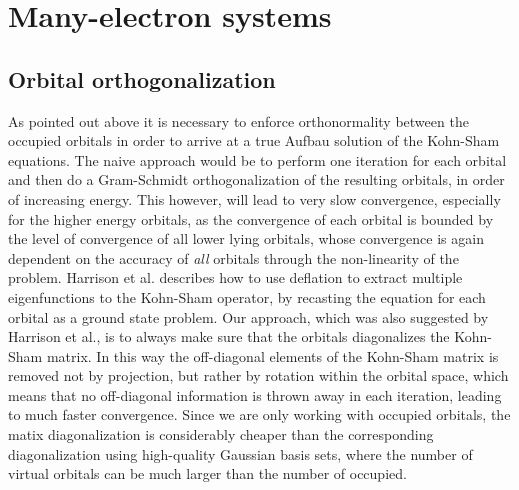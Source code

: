 \section{Many-electron systems}
\subsection{Orbital orthogonalization}
As pointed out above it is necessary to enforce orthonormality between the 
occupied orbitals in order to arrive at a true Aufbau solution of the Kohn-Sham 
equations. The naive approach would be to perform one iteration for each orbital 
and then do a Gram-Schmidt orthogonalization of the resulting orbitals, in order 
of increasing energy. This however, will lead to very slow convergence, especially 
for the higher energy orbitals, as the convergence of each orbital is bounded by 
the level of convergence of all lower lying orbitals, whose convergence is again 
dependent on the accuracy of \emph{all} orbitals through the non-linearity of the 
problem. Harrison et al. \cite{Harrison} describes how to use deflation to extract 
multiple eigenfunctions to the Kohn-Sham operator, by recasting the equation for 
each orbital as a ground state problem. Our approach, which was also suggested by 
Harrison et al., is to always make sure that the orbitals diagonalizes the Kohn-Sham 
matrix. In this way the off-diagonal elements of the Kohn-Sham matrix is removed not 
by projection, but rather by rotation within the orbital space, which means that no 
off-diagonal information is thrown away in each iteration, leading to much faster 
convergence. Since we are only working with occupied orbitals, the matix 
diagonalization is considerably cheaper than the corresponding diagonalization 
using high-quality Gaussian basis sets, where the number of virtual orbitals can 
be much larger than the number of occupied. 

